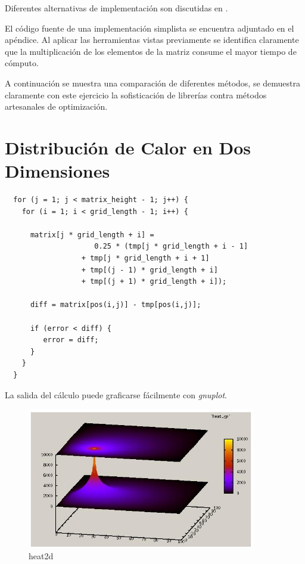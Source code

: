 \documentclass[a4paper]{report}
\begin{document}
Diferentes alternativas de implementaci\'on son discutidas en
\cite{mm-matrixmultiplicationtool}.

\bigskip

El c\'odigo fuente de una implementaci\'on simplista se encuentra adjuntado en
el ap\'endice. Al aplicar las herramientas vistas previamente se identifica
claramente que la multiplicaci\'on de los elementos de la matriz consume el
mayor tiempo de c\'omputo.

\bigskip

\bigskip

A continuaci\'on se muestra una comparaci\'on de diferentes m\'etodos, se
demuestra claramente con este ejercicio la sofisticaci\'on de librer\'ias
contra m\'etodos artesanales de optimizaci\'on.

\section{Distribuci\'on de Calor en Dos Dimensiones}

\begin{verbatim}
  for (j = 1; j < matrix_height - 1; j++) {
    for (i = 1; i < grid_length - 1; i++) {
      
      matrix[j * grid_length + i] = 
                     0.25 * (tmp[j * grid_length + i - 1]
                  + tmp[j * grid_length + i + 1]
                  + tmp[(j - 1) * grid_length + i]
                  + tmp[(j + 1) * grid_length + i]);

      diff = matrix[pos(i,j)] - tmp[pos(i,j)];

      if (error < diff) {
         error = diff;
      }
    }
  }
\end{verbatim}

La salida del c\'alculo puede graficarse f\'acilmente con {\it gnuplot}.

\begin{figure}[H]
\begin{center}
\includegraphics[width=10cm]{heat2d.png}
\caption{heat2d}
\end{center}
\end{figure}
\end{document}
